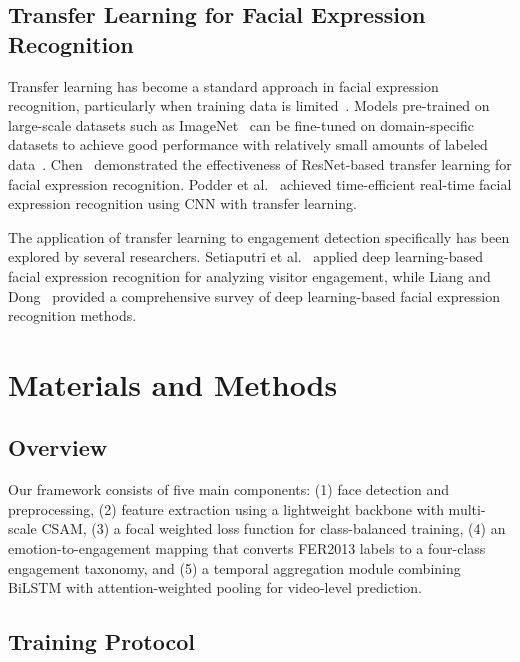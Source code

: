 \documentclass[sensors,article,submit,pdftex,moreauthors]{Definitions/mdpi}
\begin{document}
\subsection{Transfer Learning for Facial Expression Recognition}

Transfer learning has become a standard approach in facial expression recognition, particularly when training data is limited~\cite{bengio2013representation}. Models pre-trained on large-scale datasets such as ImageNet~\cite{deng2009imagenet,russakovsky2015imagenet} can be fine-tuned on domain-specific datasets to achieve good performance with relatively small amounts of labeled data~\cite{li2021facial}. Chen~\cite{chen2023resnet} demonstrated the effectiveness of ResNet-based transfer learning for facial expression recognition. Podder et al.~\cite{podder2022time} achieved time-efficient real-time facial expression recognition using CNN with transfer learning.

The application of transfer learning to engagement detection specifically has been explored by several researchers. Setiaputri et al.~\cite{setiaputri2025deep} applied deep learning-based facial expression recognition for analyzing visitor engagement, while Liang and Dong~\cite{liang2023survey} provided a comprehensive survey of deep learning-based facial expression recognition methods.

\section{Materials and Methods}
\label{sec:method}

\subsection{Overview}

Our framework consists of five main components: (1) face detection and preprocessing, (2) feature extraction using a lightweight backbone with multi-scale CSAM, (3) a focal weighted loss function for class-balanced training, (4) an emotion-to-engagement mapping that converts FER2013 labels to a four-class engagement taxonomy, and (5) a temporal aggregation module combining BiLSTM with attention-weighted pooling for video-level prediction.

\subsection{Training Protocol}
\label{sec:training}
\end{document}
